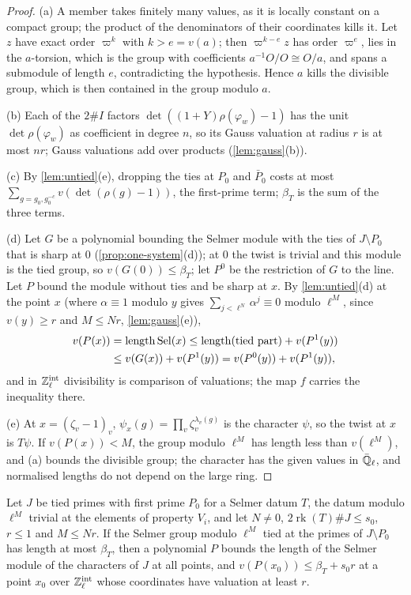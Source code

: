 \begin{proof}
(a) A member takes finitely many values, as it is locally constant on a compact group; the product of the denominators of their coordinates kills it. Let $z$ have exact order $\varpi^k$ with $k>e=v(a)$; then $\varpi^{k-e}z$ has order $\varpi^e$, lies in the $a$-torsion, which is the group with coefficients $a^{-1}O/O\cong O/a$, and spans a
submodule of length $e$, contradicting the hypothesis. Hence $a$ kills the divisible group, which is then contained in the group modulo $a$.

(b) Each of the $2\#I$ factors $\det((1+Y)\rho(\varphi_w)-1)$ has the unit $\det\rho(\varphi_w)$ as coefficient in degree $n$, so its Gauss valuation at radius $r$ is at most $nr$; Gauss valuations add over products (\cref{lem:gauss}(b)).

(c) By \cref{lem:untied}(e), dropping the ties at $P_0$ and $\bar P_0$ costs at most $\sum_{g=g_0,g_0^{-c}}v(\det(\rho(g)-1))$, the first-prime term; $\beta_T$ is the sum of the three terms.

(d) Let $G$ be a polynomial bounding the Selmer module with the ties of $J\setminus P_0$ that is sharp at $0$ (\cref{prop:one-system}(d)); at $0$ the twist is trivial and this module is the tied group, so $v(G(0))\le\beta_T$; let $P^0$ be the restriction of $G$ to the line. Let $P$ bound the module without ties and be sharp at $x$. By \cref{lem:untied}(d) at
the point $x$ (where $\alpha\equiv1$ modulo $y$ gives $\sum_{j<\ell^N}\alpha^j\equiv0$ modulo $\ell^M$, since $v(y)\ge r$ and $M\le Nr$, \cref{lem:gauss}(e)),
\begin{align*}v(P(x))&=\operatorname{length}\mathrm{Sel}(x)\le\operatorname{length}(\text{tied part})+v(P^1(y))\\&\le v(G(x))+v(P^1(y))=v(P^0(y))+v(P^1(y)),\end{align*}
and in $\mathbb{Z}_\ell^{\rm int}$ divisibility is comparison of valuations; the map $f$ carries the inequality there.

(e) At $x=(\zeta_v-1)_v$, $\psi_x(g)=\prod_v\zeta_v^{\lambda_v(g)}$ is the character $\psi$, so the twist at $x$ is $T\psi$. If $v(P(x))<M$, the group modulo $\ell^M$ has length less than $v(\ell^M)$, and (a) bounds the divisible group; the character has the given values in $\bar{\mathbb{Q}}_\ell$, and normalised lengths do not depend on the large ring.
\end{proof}

\begin{proposition}\label{prop:line}
Let $J$ be tied primes with first prime $P_0$ for a Selmer datum $T$, the datum modulo $\ell^M$ trivial at the elements of property $V_i$, and let $N\ne0$, $2\operatorname{rk}(T)\#J\le s_0$, $r\le1$ and $M\le Nr$. If the Selmer group
modulo $\ell^M$ tied at the primes of $J\setminus P_0$ has length at most $\beta_T$, then a polynomial $P$ bounds the length of the Selmer module of the characters of $J$ at all points, and $v(P(x_0))\le\beta_T+s_0r$ at a point $x_0$
over $\mathbb{Z}_\ell^{\rm int}$ whose coordinates have valuation at least $r$.
\end{proposition}

